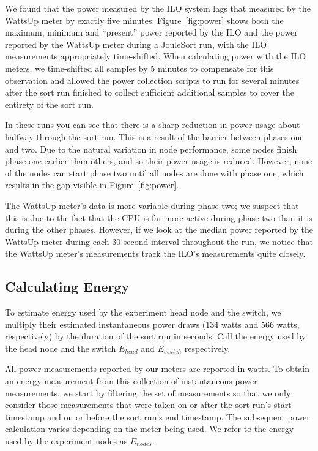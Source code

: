 We found that the power measured by the ILO system lags that measured by the
WattsUp meter by exactly five minutes. Figure~\ref{fig:power} shows both the
maximum, minimum and ``present'' power reported by the ILO and the power
reported by the WattsUp meter during a JouleSort run, with the ILO
measurements appropriately time-shifted. When calculating power with the ILO
meters, we time-shifted all samples by 5 minutes to compensate for this
observation and allowed the power collection scripts to run for several minutes
after the sort run finished to collect sufficient additional samples to cover
the entirety of the sort run.

In these runs you can see that there is a sharp reduction in power usage about
halfway through the sort run.  This is a result of the barrier between phases
one and two.  Due to the natural variation in node performance, some nodes
finish phase one earlier than others, and so their power usage is reduced.
However, none of the nodes can start phase two until all nodes are done with
phase one, which results in the gap visible in Figure~\ref{fig:power}.

The WattsUp meter's data is more variable during phase two; we suspect that
this is due to the fact that the CPU is far more active during phase two than
it is during the other phases. However, if we look at the median power reported
by the WattsUp meter during each 30 second interval throughout the run, we
notice that the WattsUp meter's measurements track the ILO's measurements quite
closely.


\subsection{Calculating Energy}

To estimate energy used by the experiment head node and the switch, we
multiply their estimated instantaneous power draws (134 watts and 566 watts,
respectively) by the duration of the sort run in seconds. Call the energy
used by the head node and the switch $E_{head}$ and $E_{switch}$ respectively.

All power measurements reported by our meters are reported in watts. To obtain
an energy measurement from this collection of instantaneous power measurements,
we start by filtering the set of measurements so that we only consider those
measurements that were taken on or after the sort run's start timestamp and on
or before the sort run's end timestamp. The subsequent power calculation varies
depending on the meter being used. We refer to the energy used by the
experiment nodes as $E_{nodes}$.

